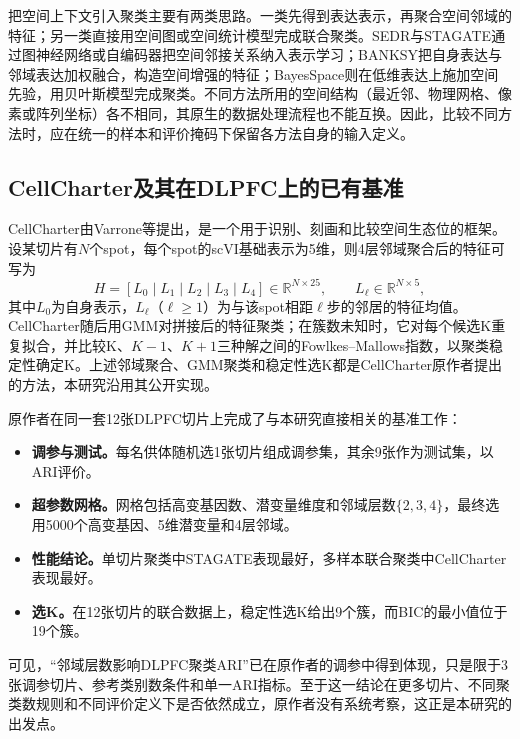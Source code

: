 把空间上下文引入聚类主要有两类思路。一类先得到表达表示，再聚合空间邻域的特征；另一类直接用空间图或空间统计模型完成联合聚类。SEDR\cite{xu2024}与STAGATE\cite{dong2022stagate}通过图神经网络或自编码器把空间邻接关系纳入表示学习；BANKSY把自身表达与邻域表达加权融合，构造空间增强的特征\cite{singhal2024}；BayesSpace则在低维表达上施加空间先验，用贝叶斯模型完成聚类\cite{zhao2021}。不同方法所用的空间结构（最近邻、物理网格、像素或阵列坐标）各不相同，其原生的数据处理流程也不能互换。因此，比较不同方法时，应在统一的样本和评价掩码下保留各方法自身的输入定义。

\subsection{CellCharter及其在DLPFC上的已有基准}
\label{subsec:cc-cellcharter-p1}
CellCharter由Varrone等提出，是一个用于识别、刻画和比较空间生态位的框架\cite{varrone2024}。设某切片有$N$个spot，每个spot的scVI基础表示为5维，则4层邻域聚合后的特征可写为
\begin{equation}
H=[L_0\mid L_1\mid L_2\mid L_3\mid L_4]\in\mathbb{R}^{N\times25},\qquad L_\ell\in\mathbb{R}^{N\times5},
\label{eq:cc-H-bg-p1}
\end{equation}
其中$L_0$为自身表示，$L_\ell$（$\ell\ge1$）为与该spot相距$\ell$步的邻居的特征均值。CellCharter随后用GMM对拼接后的特征聚类；在簇数未知时，它对每个候选K重复拟合，并比较K、$K-1$、$K+1$三种解之间的Fowlkes--Mallows指数\cite{fowlkes1983}，以聚类稳定性确定K。上述邻域聚合、GMM聚类和稳定性选K都是CellCharter原作者提出的方法，本研究沿用其公开实现。

原作者在同一套12张DLPFC切片上完成了与本研究直接相关的基准工作\cite{varrone2024,cellcharteranalyses2024}：
\begin{itemize}
  \item \textbf{调参与测试。}每名供体随机选1张切片组成调参集，其余9张作为测试集，以ARI评价。
  \item \textbf{超参数网格。}网格包括高变基因数、潜变量维度和邻域层数$\{2,3,4\}$，最终选用5000个高变基因、5维潜变量和4层邻域。
  \item \textbf{性能结论。}单切片聚类中STAGATE表现最好，多样本联合聚类中CellCharter表现最好。
  \item \textbf{选K。}在12张切片的联合数据上，稳定性选K给出9个簇，而BIC的最小值位于19个簇。
\end{itemize}
可见，“邻域层数影响DLPFC聚类ARI”已在原作者的调参中得到体现，只是限于3张调参切片、参考类别数条件和单一ARI指标。至于这一结论在更多切片、不同聚类数规则和不同评价定义下是否依然成立，原作者没有系统考察，这正是本研究的出发点。

